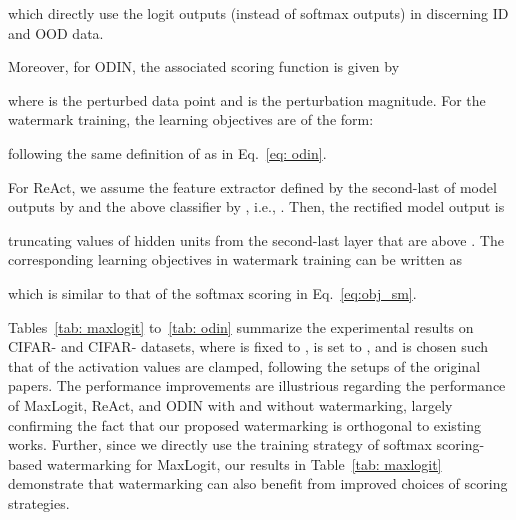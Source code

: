 \documentclass{article}
\begin{document}
{which directly use the logit outputs (instead of softmax outputs) in discerning ID and OOD data. }

Moreover, for ODIN, the associated scoring function is given by

where  is the perturbed data point and  is the perturbation magnitude. For the watermark training, the learning objectives are of the form:

following the same definition of  as in Eq.~\eqref{eq: odin}. 


For ReAct, we assume the feature extractor defined by the second-last of model outputs by  and the above classifier by , i.e., . Then, the rectified model output is

truncating values of hidden units from the second-last layer that are above . The corresponding learning objectives in watermark training can be written as

which is similar to that of the softmax scoring in Eq.~\eqref{eq:obj_sm}. 



Tables~\ref{tab: maxlogit} to~\ref{tab: odin} summarize the experimental results on CIFAR- and CIFAR- datasets, where  is fixed to ,  is set to , and  is chosen such that  of the activation values are clamped, following the setups of the original papers. The performance improvements are illustrious regarding the performance of MaxLogit, ReAct, and ODIN with and without watermarking, largely confirming the fact that our proposed watermarking is orthogonal to existing works. {Further, since we directly use the training strategy of softmax scoring-based watermarking for MaxLogit, our results in Table~\ref{tab: maxlogit} demonstrate that watermarking can also benefit from improved choices of scoring strategies. }
\end{document}
